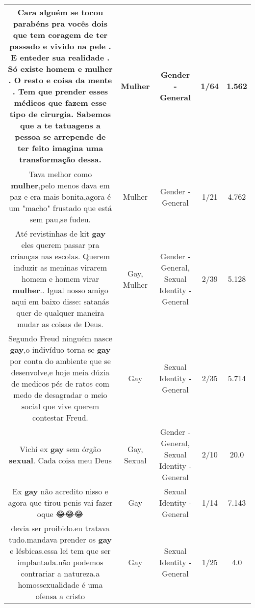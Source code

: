 \documentclass[11pt]{article}
\newlength\mylength
\begin{document}
\begin{center}
\begin{longtable}{|C{.65\mylength}|C{.30\mylength}|C{.12\mylength}|C{.12\mylength}|C{.12\mylength}|}
  \small Cara alguém se tocou parabéns pra vocês dois que tem coragem de ter passado e vivido na pele . E enteder sua realidade . Só existe homem e \textbf{mulher} . O resto e coisa da mente . Tem que prender esses médicos que fazem esse tipo de cirurgia. Sabemos que a te tatuagens a pessoa se arrepende de ter feito imagina uma transformação dessa.\normalsize   & Mulher & Gender - General & 1/64 & 1.562 \\  \hline
  \small Tava melhor como \textbf{mulher},pelo menos dava em paz e era mais bonita,agora é um "macho" frustado que está sem pau,se fudeu.\normalsize   & Mulher & Gender - General & 1/21 & 4.762 \\  \hline
  \small Até revistinhas de kit \textbf{gay} eles querem passar pra crianças nas escolas. Querem induzir as meninas virarem homem e homem virar \textbf{mulher}.. Igual nosso amigo aqui em baixo disse: satanás quer de qualquer maneira mudar as coisas de Deus.\normalsize   & Gay, Mulher & Gender - General, Sexual Identity - General & 2/39 & 5.128 \\  \hline
  \small Segundo Freud ninguém nasce \textbf{gay},o indivíduo torna-se \textbf{gay} por conta do ambiente que se desenvolve,e hoje meia dúzia de medicos pés de ratos com medo de desagradar o meio social que vive  querem contestar Freud.\normalsize   & Gay & Sexual Identity - General & 2/35 & 5.714 \\  \hline
  \small Vichi ex \textbf{gay} sem órgão \textbf{sexual}. Cada coisa meu Deus\normalsize   & Gay, Sexual & Gender - General, Sexual Identity - General & 2/10 & 20.0 \\  \hline
  \small Ex \textbf{gay} não acredito nisso e agora que tirou penis vai fazer oque 😂😂😂\normalsize   & Gay & Sexual Identity - General & 1/14 & 7.143 \\  \hline
  \small devia ser proibido.eu tratava tudo.mandava prender os \textbf{gay} e lésbicas.essa lei tem que ser implantada.não podemos contrariar a natureza.a homossexualidade é uma ofensa a cristo\normalsize   & Gay & Sexual Identity - General & 1/25 & 4.0 \\  \hline

\end{longtable}
\end{center}
\end{document}
